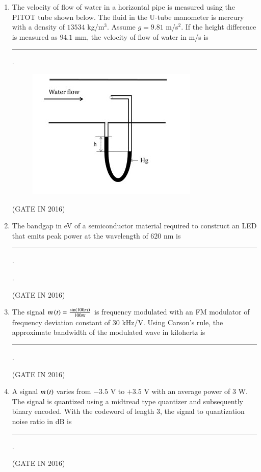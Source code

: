 \documentclass[journal,12pt,onecolumn]{IEEEtran}
\theoremstyle{remark}
\begin{document}
\begin{enumerate}
\item The velocity of flow of water  in a horizontal pipe is measured using the PITOT tube shown below. The fluid in the U-tube manometer is mercury with a density of $13534$ kg/m$^3$. Assume $g = 9.81$ m/s$^2$. If the height difference  is measured as $94.1$ mm, the velocity of flow of water in m/s is \rule{2cm}{0.4pt}.
\begin{figure}[h!]
\centering
\includegraphics[width=0.6\columnwidth]{figs/z29.jpg}
\caption*{}
\label{fig:z29}
\end{figure}

\hfill{(GATE IN 2016)}

\item The bandgap in eV of a semiconductor material required to construct an LED that emits peak power at the wavelength of $620$ nm is \rule{2cm}{0.4pt}.

.

\hfill{(GATE IN 2016)}

\item The signal $m\left(t\right) = \frac{\sin\left(100 \pi t\right)}{100 \pi t}$ is frequency modulated  with an FM modulator of frequency deviation constant of $30$ kHz/V. Using Carson's rule, the approximate bandwidth of the modulated wave in kilohertz is \rule{2cm}{0.4pt}.

\hfill{(GATE IN 2016)}

\item A signal $m\left(t\right)$ varies from $-3.5$ V to $+3.5$ V with an average power of $3$ W. The signal is quantized using a midtread type quantizer and subsequently binary encoded. With the codeword of length 3, the signal to quantization noise ratio in dB is \rule{2cm}{0.4pt}.

\hfill{(GATE IN 2016)}

\end{enumerate}
\end{document}
